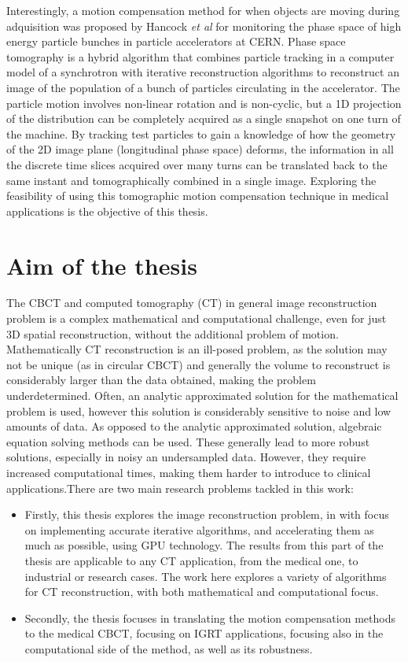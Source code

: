 Interestingly, a motion compensation method for when objects are moving during adquisition was proposed by Hancock \textit{et al}\cite{pst1}\cite{pst2}\cite{pstweb} for monitoring the phase space of high energy particle bunches in particle accelerators at CERN. Phase space tomography is a hybrid algorithm that combines particle tracking in a computer model of a synchrotron with iterative reconstruction algorithms to reconstruct an image of the population of a bunch of particles circulating in the accelerator. The particle motion involves non-linear rotation and is non-cyclic, but a 1D projection of the distribution can be completely acquired as a single snapshot on one turn of the machine. By tracking test particles to gain a knowledge of how the geometry of the 2D image plane (longitudinal phase space) deforms, the information in all the discrete time slices acquired over many turns can be translated back to the same instant and tomographically combined in a single image.  Exploring the feasibility of using this tomographic motion compensation technique in medical applications is the objective of this thesis.



\section{Aim of the thesis}

The CBCT and computed tomography (CT) in general image reconstruction problem is a complex mathematical and computational challenge, even for just 3D spatial reconstruction, without the additional problem of motion. Mathematically CT reconstruction is an ill-posed problem, as the solution may not be unique (as in circular CBCT) and generally the volume to reconstruct is considerably larger than the  data obtained, making the problem underdetermined. Often, an analytic approximated solution for the  mathematical problem is used, however this solution is considerably sensitive to noise and low amounts of data. As opposed to the analytic approximated solution, algebraic equation solving methods can be used. These generally lead to more robust solutions, especially in noisy an undersampled data. However, they require increased computational times, making them harder to introduce to clinical applications.There are two main research problems tackled in this work:

\begin{itemize}
\item Firstly, this thesis explores the image reconstruction problem, in with focus on implementing accurate iterative algorithms, and accelerating them as much as possible, using GPU technology. The results from this part of the thesis are applicable to any CT application, from the medical one, to industrial or research cases. The work here explores a variety of algorithms for CT reconstruction, with both mathematical and computational focus.
\item Secondly, the thesis focuses in translating the motion compensation methods to the medical CBCT, focusing on IGRT applications, focusing also in the computational side of the method, as well as its robustness.
\end{itemize}

